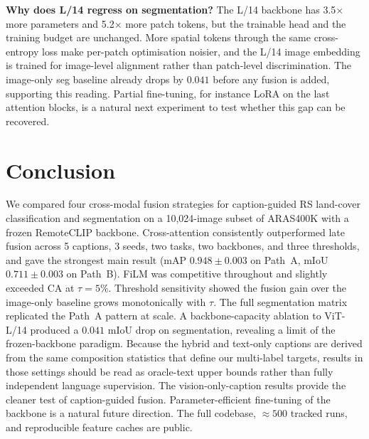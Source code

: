 \documentclass[conference]{IEEEtran}
\begin{document}
\textbf{Why does L/14 regress on segmentation?} The L/14 backbone has 3.5$\times$ more parameters and 5.2$\times$ more patch tokens, but the trainable head and the training budget are unchanged. More spatial tokens through the same cross-entropy loss make per-patch optimisation noisier, and the L/14 image embedding is trained for image-level alignment rather than patch-level discrimination. The image-only seg baseline already drops by $0.041$ before any fusion is added, supporting this reading. Partial fine-tuning, for instance LoRA on the last attention blocks, is a natural next experiment to test whether this gap can be recovered.

\section{Conclusion}

We compared four cross-modal fusion strategies for caption-guided RS land-cover classification and segmentation on a 10{,}024-image subset of ARAS400K with a frozen RemoteCLIP backbone. Cross-attention consistently outperformed late fusion across 5 captions, 3 seeds, two tasks, two backbones, and three thresholds, and gave the strongest main result (mAP $0.948 \pm 0.003$ on Path~A, mIoU $0.711 \pm 0.003$ on Path~B). FiLM was competitive throughout and slightly exceeded CA at $\tau{=}5\%$. Threshold sensitivity showed the fusion gain over the image-only baseline grows monotonically with $\tau$. The full segmentation matrix replicated the Path~A pattern at scale. A backbone-capacity ablation to ViT-L/14 produced a $0.041$ mIoU drop on segmentation, revealing a limit of the frozen-backbone paradigm. Because the hybrid and text-only captions are derived from the same composition statistics that define our multi-label targets, results in those settings should be read as oracle-text upper bounds rather than fully independent language supervision. The vision-only-caption results provide the cleaner test of caption-guided fusion. Parameter-efficient fine-tuning of the backbone is a natural future direction. The full codebase, $\approx 500$ tracked runs, and reproducible feature caches are public.
\end{document}
